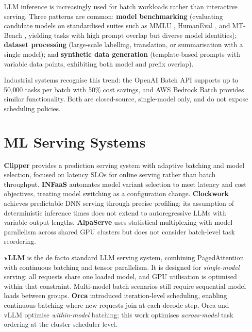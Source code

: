 \documentclass[logo,bsc,singlespacing,parskip,online]{infthesis}
\begin{document}
LLM inference is increasingly used for batch workloads rather than interactive serving. Three patterns are common: \textbf{model benchmarking} (evaluating candidate models on standardised suites such as MMLU \citep{hendrycks2020measuring}, HumanEval \citep{chen2021evaluating}, and MT-Bench \citep{zheng2023judging}, yielding tasks with high prompt overlap but diverse model identities); \textbf{dataset processing} (large-scale labelling, translation, or summarisation with a single model); and \textbf{synthetic data generation} (template-based prompts with variable data points, exhibiting both model and prefix overlap).

Industrial systems recognise this trend: the OpenAI Batch API \citep{openai_batch_api} supports up to 50,000 tasks per batch with 50\% cost savings, and AWS Bedrock Batch \citep{aws_bedrock_batch} provides similar functionality. Both are closed-source, single-model only, and do not expose scheduling policies.

\section{ML Serving Systems}

\textbf{Clipper} \citep{crankshaw2017clipper} provides a prediction serving system with adaptive batching and model selection, focused on latency SLOs for online serving rather than batch throughput. \textbf{INFaaS} \citep{romero2021infaas} automates model variant selection to meet latency and cost objectives, treating model switching as a configuration change. \textbf{Clockwork} \citep{gujarati2020serving} achieves predictable DNN serving through precise profiling; its assumption of deterministic inference times does not extend to autoregressive LLMs with variable output lengths. \textbf{AlpaServe} \citep{li2023alpaserve} uses statistical multiplexing with model parallelism across shared GPU clusters but does not consider batch-level task reordering.

\textbf{vLLM} \citep{kwon2023efficient} is the de facto standard LLM serving system, combining PagedAttention with continuous batching and tensor parallelism. It is designed for \textit{single-model} serving: all requests share one loaded model, and GPU utilisation is optimised within that constraint. Multi-model batch scenarios still require sequential model loads between groups. \textbf{Orca} \citep{yu2022orca} introduced iteration-level scheduling, enabling continuous batching where new requests join at each decode step. Orca and vLLM optimise \textit{within-model} batching; this work optimises \textit{across-model} task ordering at the cluster scheduler level.
\end{document}
